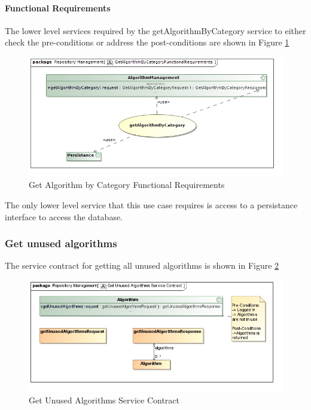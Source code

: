\paragraph{Functional Requirements}
The lower level services required by the getAlgorithmByCategory service to either check the
pre-conditions or address the post-conditions are shown in Figure \ref{fig:getAlgorithmByCategoryFR}
\begin{figure}[H]
  \begin{center}
  \includegraphics[scale=0.6]{../Diagrams and Charts/Test Data/GetAlgorithmByCategoryFunctionalRequirements.jpg}
  \caption{Get Algorithm by Category Functional Requirements}
  \label{fig:getAlgorithmByCategoryFR}
  \end{center}
\end{figure}

The only lower level service that this use case requires is access to
a persistance interface to access the database.

\subsubsection {Get unused algorithms}
The service contract for getting all unused algorithms is shown in Figure \ref{fig:getUnusedAlgorithmsService}
\begin{figure}[H]
  \begin{center}
  \includegraphics[scale=0.6]{../Diagrams and Charts/Test Data/Get Unused Algorithms Service Contract.jpg}
  \caption{Get Unused Algorithms Service Contract}
  \label{fig:getUnusedAlgorithmsService}
  \end{center}
  
\end{figure}

